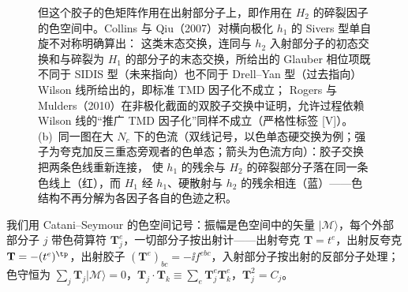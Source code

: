 \begin{figure}[htbp]
{但这个胶子的色矩阵作用在出射部分子上，即作用在 $H_2$ 的碎裂因子的色空间中。Collins 与 Qiu（2007）对横向极化 $h_1$ 的 Sivers 型单自旋不对称明确算出：
这类末态交换，连同与 $h_2$ 入射部分子的初态交换和与碎裂为 $H_1$ 的部分子的末态交换，所给出的 Glauber 相位项既不同于 SIDIS 型（未来指向）也不同于 Drell--Yan 型（过去指向）Wilson 线所给出的，即标准 TMD 因子化不成立；
Rogers 与 Mulders（2010）在非极化截面的双胶子交换中证明，允许过程依赖 Wilson 线的“推广 TMD 因子化”同样不成立（严格性标签 [V]）。
(b)~同一图在大 $N_c$ 下的色流（双线记号，以色单态硬交换为例；强子为夸克加反三重态旁观者的色单态；箭头为色流方向）：胶子交换把两条色线重新连接，
使 $h_1$ 的残余与 $H_2$ 的碎裂部分子落在同一条色线上（红），而 $H_1$ 经 $h_1$、硬散射与 $h_2$ 的残余相连（蓝）——色结构不再分解为各因子各自的色迹之积。}
\label{fig:violation-cq}
\end{figure}

我们用 Catani--Seymour 的色空间记号\cite{CataniSeymour1997}：振幅是色空间中的矢量 $|\mathcal M\rangle$，每个外部部分子 $j$ 带色荷算符 $\mathbf T_j^e$，一切部分子按出射计——出射夸克 $\mathbf T=t^e$，出射反夸克 $\mathbf T=-(t^e)^{\tp}$，出射胶子 $(\mathbf T^e)_{bc}=-\ii f^{ebc}$，入射部分子按出射的反部分子处理；色守恒为 $\sum_j\mathbf T_j|\mathcal M\rangle=0$，$\mathbf T_j\cdot\mathbf T_k\equiv\sum_e\mathbf T_j^e\mathbf T_k^e$，$\mathbf T_j^2=C_j$。

